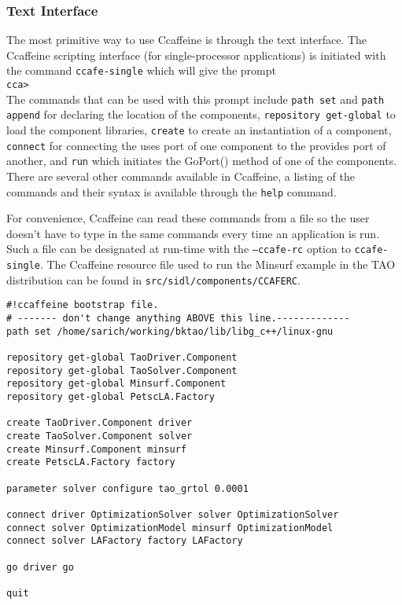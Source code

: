 \documentclass[doublespacing,12pt]{article}
\begin{document}
\subsubsection{Text Interface}\label{sec:textinterface}
The most primitive way to use Ccaffeine is through the text interface.
The Ccaffeine scripting interface (for single-processor applications)
is initiated with the command \texttt{ccafe-single} which will give
the prompt \\
\noindent \texttt{cca>}\\

The commands that can be used with this prompt include \texttt{path
set} and \texttt{path append} for declaring the location of the
components, \texttt{repository get-global} to load the component
libraries, \texttt{create} to create an instantiation of a
component, \texttt{connect} for connecting the uses port of one
component to the provides port of another, and \texttt{run} which
initiates the \textsf{GoPort()} method of one of the components.
There are several other commands available in Ccaffeine, a listing of
the commands
and their syntax is available through the \texttt{help} command.

For convenience, Ccaffeine can read these commands from a file so the
user doesn't have to type in the same commands every time an
application is run.  Such a file can be designated at run-time with
the \texttt{--ccafe-rc} option to \texttt{ccafe-single}.  The
Ccaffeine resource file used to run the Minsurf example in the TAO
distribution can be found in \texttt{src/sidl/components/CCAFERC}.

\begin{verbatim}
#!ccaffeine bootstrap file.
# ------- don't change anything ABOVE this line.-------------
path set /home/sarich/working/bktao/lib/libg_c++/linux-gnu

repository get-global TaoDriver.Component
repository get-global TaoSolver.Component
repository get-global Minsurf.Component
repository get-global PetscLA.Factory

create TaoDriver.Component driver
create TaoSolver.Component solver
create Minsurf.Component minsurf
create PetscLA.Factory factory

parameter solver configure tao_grtol 0.0001

connect driver OptimizationSolver solver OptimizationSolver
connect solver OptimizationModel minsurf OptimizationModel
connect solver LAFactory factory LAFactory

go driver go

quit
\end{verbatim}
\end{document}

